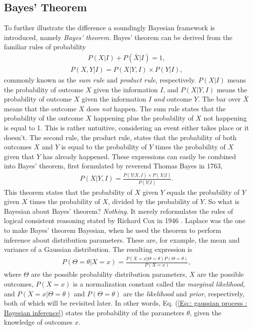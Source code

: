 \documentclass[twoside,english]{uiofysmaster}
\begin{document}
\subsection{Bayes' Theorem}

To further illustrate the difference a soundingly Bayesian framework is introduced, namely \textit{Bayes' theorem}. Bayes' theorem can be derived from the familiar rules of probability
\begin{align}\label{Eq:: Sum rule}
P(X | I) + P(\bar{X} | I) = 1,
\end{align}
\begin{align}\label{Eq:: Product rule}
P(X, Y | I) = P(X | Y, I) \times P(Y | I),
\end{align} 
commonly known as the \textit{sum rule} and \textit{product rule}, respectively. $P(X|I)$ means the probability of outcome $X$ given the information $I$, and $P(X|Y,I)$ means the probability of outcome $X$ given the information $I$ \textit{and} outcome $Y$. The bar over $\bar{X}$ means that the outcome $X$ does \textit{not} happen. The sum rule states that the probability of the outcome $X$ happening plus the probability of $X$ not happening is equal to 1. This is rather untuitive, considering an event either takes place or it doesn't. The second rule, the product rule, states that the probability of both outcomes $X$ and $Y$ is equal to the probability of $Y$ times the probability of $X$ given that $Y$ has already happened. 
These expressions can easily be combined into Bayes' theorem, first formulated by reverend Thomas Bayes in 1763,
\begin{align}\label{Eq:: gaussian process : Bayes theorem}
P(X | Y, I) = \frac{P(Y | X, I) \times P(X | I)}{P(Y | I)}.
\end{align}
This theorem states that the probability of $X$ given $Y$ equals the probability of $Y$ given $X$ times the probability of $X$, divided by the probability of $Y$. So what is Bayesian about Bayes' theorem? \textit{Nothing}. It merely reformulates the rules of logical consistent reasoning stated by Richard Cox in 1946 \cite{sivia2006data}. Laplace was the one to make Bayes' theorem Bayesian, when he used the theorem to perform inference about distribution parameters. These are, for example, the mean and variance of a Gaussian distribution. The resulting expression is
\begin{align}
P(\Theta = \theta | X=x) = \frac{P(X=x|\Theta = \theta) P(\Theta = \theta)}{P(X=x)},\label{Eq:: gaussian process : Bayesian inference}
\end{align}
where $\Theta$ are the possible probability distribution parameters, $X$ are the possible outcomes, $P(X=x)$ is a normalization constant called the \textit{marginal likelihood}, and $P(X=x|\Theta = \theta)$  and $P(\Theta = \theta)$ are the \textit{likelihood} and \textit{prior}, respectively, both of which will be revisited later. In other words, Eq. (\ref{Eq:: gaussian process : Bayesian inference}) states the probability of the parameters $\theta$, given the knowledge of outcomes $x$.
\end{document}
